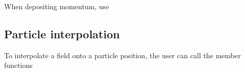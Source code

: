 \documentclass[letterpaper,10pt,english]{sphinxmanual}
\begin{document}
\sphinxAtStartPar
When depositing momentum, use

\begin{sphinxVerbatim}[commandchars=\\\{\},formatcom=\scriptsize]
  
\end{sphinxVerbatim}


\subsection{Particle interpolation}
\label{\detokenize{Source/Particles:particle-interpolation}}
\sphinxAtStartPar
To interpolate a field onto a particle position, the user can call the  member functions
\end{document}
